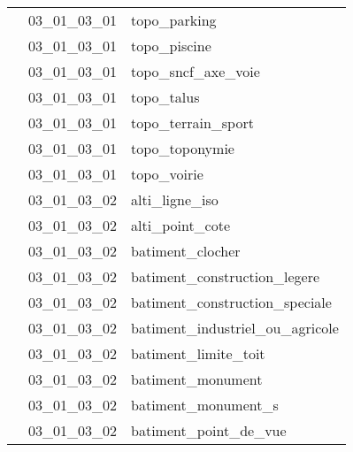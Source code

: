 \documentclass[12pt,titlepage]{book}
\begin{document}
\begin{supertabular}{|p{10cm}|c|p{15cm}|}
                    & 03\_01\_03\_01 & topo\_parking\\


                    & 03\_01\_03\_01 & topo\_piscine\\


                    & 03\_01\_03\_01 & topo\_sncf\_axe\_voie\\


                    & 03\_01\_03\_01 & topo\_talus\\


                    & 03\_01\_03\_01 & topo\_terrain\_sport\\


                    & 03\_01\_03\_01 & topo\_toponymie\\


                    & 03\_01\_03\_01 & topo\_voirie\\


                    & 03\_01\_03\_02 & alti\_ligne\_iso\\


                    & 03\_01\_03\_02 & alti\_point\_cote\\


                    & 03\_01\_03\_02 & batiment\_clocher\\


                    & 03\_01\_03\_02 & batiment\_construction\_legere\\


                    & 03\_01\_03\_02 & batiment\_construction\_speciale\\


                    & 03\_01\_03\_02 & batiment\_industriel\_ou\_agricole\\


                    & 03\_01\_03\_02 & batiment\_limite\_toit\\


                    & 03\_01\_03\_02 & batiment\_monument\\


                    & 03\_01\_03\_02 & batiment\_monument\_s\\


                    & 03\_01\_03\_02 & batiment\_point\_de\_vue\\



\end{supertabular}
\end{document}
